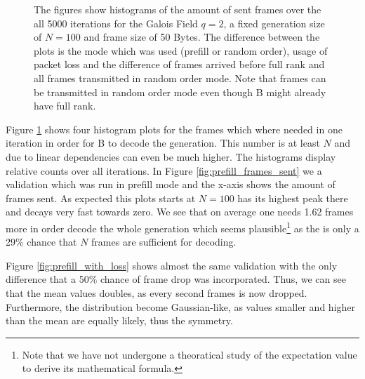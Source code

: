\documentclass[a4paper,english,10pt]{tumarticle}
\begin{document}
\begin{figure}[htb]
  \hfill
  \caption{The figures show histograms of the amount of sent frames over the all 5000 iterations for the Galois Field $q=2$, a fixed generation size of $N=100$ and frame size of 50 Bytes. The difference between the plots is the mode which was used (prefill or random order), usage of packet loss and the difference of frames arrived before full rank and all frames transmitted in random order mode. Note that frames can be transmitted in random order mode even though B might already have full rank.}
  \label{fig:hists}
\end{figure}

Figure \ref{fig:hists} shows four histogram plots for the frames which where needed in one iteration in order for B to decode the generation. This number is at least $N$ and due to linear dependencies can even be much higher. The histograms display relative counts over all iterations. In Figure \ref{fig:prefill_frames_sent} we a validation which was run in prefill mode and the x-axis shows the amount of frames sent. As expected this plots starts at $N=100$ has its highest peak there and decays very fast towards zero. We see that on average one needs 1.62 frames more in order decode the whole generation which seems plausible\footnote{Note that we have not undergone a theoratical study of the expectation value to derive its mathematical formula.} as the is only a 29\% chance that $N$ frames are sufficient for decoding. 

Figure \ref{fig:prefill_with_loss} shows almost the same validation with the only difference that a 50\% chance of frame drop was incorporated. Thus, we can see that the mean values doubles, as every second frames is now dropped. Furthermore, the distribution become Gaussian-like, as values smaller and higher than the mean are equally likely, thus the symmetry.
\end{document}
